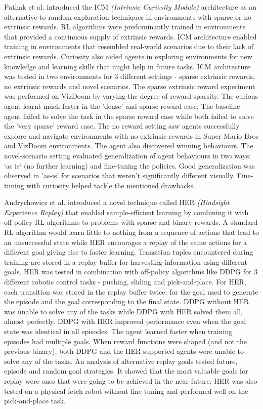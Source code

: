 \documentclass[12pt,a4paper]{article}
\begin{document}
Pathak et al. \cite{cdl} introduced the ICM \textit{(Intrinsic Curiosity Module)} 
architecture as an alternative to random exploration techniques in environments with 
sparse or no extrinsic rewards. RL algorithms were predominantly trained in environments
that provided a continuous supply of extrinsic rewards. ICM architecture enabled 
training in environments that resembled real-world scenarios due to their lack of 
extrinsic rewards. Curiosity also aided agents in exploring environments for new 
knowledge and learning skills that might help in future tasks. ICM architecture 
was tested in two environments for 3 different settings - sparse extrinsic rewards, 
no extrinsic rewards and novel scenarios. The sparse extrinsic reward experiment was 
performed on VizDoom by varying the degree of reward sparsity. The curious agent learnt
much faster in the 'dense' and sparse reward case. The baseline agent failed to solve
the task in the sparse reward case while both failed to solve the 'very sparse' 
reward case. The no reward setting saw agents successfully explore and navigate 
environments with no extrinsic rewards in Super Mario Bros and VizDoom environments.
The agent also discovered winning behaviours. The novel-scenario setting evaluated 
generalization of agent behaviours in two ways: `as is` (no further learning) and 
fine-tuning the policies. Good generalization was observed in 'as-is' for scenarios 
that weren't significantly different visually. Fine-tuning with curiosity helped 
tackle the mentioned drawbacks.

Andrychowicz et al. \cite{her} introduced a novel technique called HER 
\textit{(Hindsight Experience Replay)} that enabled sample-efficient learning by 
combining it with off-policy RL algorithms to problems with sparse and binary 
rewards. A standard RL algorithm would learn little to nothing from a sequence of 
actions that lead to an unsuccessful state while HER encourages a replay of the same
actions for a different goal giving rise to faster learning. Transition tuples 
encountered during training are stored in a replay buffer for harvesting 
information using different goals. HER was tested in combination with off-policy 
algorithms like DDPG for 3 different robotic control tasks - pushing, sliding and pick-and-place.
For HER, each transition was stored in the replay buffer twice: for the goal used to 
generate the episode and the goal corresponding to the final state. DDPG without 
HER was unable to solve any of the tasks while DDPG with HER solved them all, almost
perfectly. DDPG with HER improved 
performance even when the goal state was identical in all episodes. The agent 
learned faster when training episodes had multiple goals. When reward functions
were shaped (and not the previous binary), both DDPG and the HER supported agents
were unable to solve any of the tasks. An analysis of alternative replay goals
tested future, episode and random goal strategies. It showed
that the most valuable goals for replay were ones that were going to be achieved
in the near future. HER was also tested on a physical fetch robot without fine-tuning
and performed well on the pick-and-place task.
\end{document}
